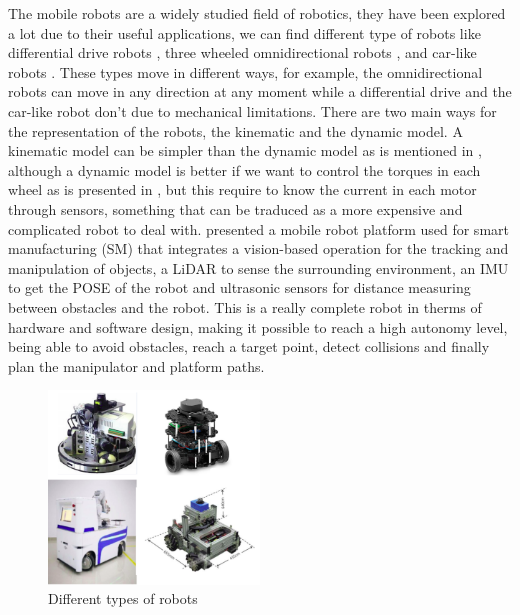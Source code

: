 The mobile robots are a widely studied field of robotics, they have been explored a lot due to their useful applications, we can find different type of robots like differential drive robots \citep{akhtar2011dynamic}, three wheeled omnidirectional robots \citep{hacene2019fuzzy}, and car-like robots \citep{wang2021training}. These types move in different ways, for example, the omnidirectional robots can move in any direction at any moment while a differential drive and the car-like robot don't due to mechanical limitations.
There are two main ways for the representation of the robots, the kinematic and the dynamic model. A kinematic model can be simpler than the dynamic model as is mentioned in \citep{akhtar2011dynamic}, although a dynamic model is better if we want to control the torques in each wheel as is presented in \citep{arcos2019optimal}, but this require to know the current in each motor through sensors, something that can be traduced as a more expensive and complicated robot to deal with.  
\citep{wang2021training} presented a mobile robot platform used for smart manufacturing (SM) that integrates a vision-based operation for the tracking and manipulation of objects, a LiDAR to sense the surrounding environment, an IMU to get the POSE of the robot and ultrasonic sensors for distance measuring between obstacles and the robot. This is a really complete robot in therms of hardware and software design, making it possible to reach a high autonomy level, being able to avoid obstacles, reach a target point, detect collisions and finally plan the manipulator and platform paths.     

\begin{figure}[h!]
    \centering
 	\includegraphics[trim=0 0 0 0,clip,width=0.5\textwidth]{Figs/Robot_types.png}
    \caption{Different types of robots}
    \label{fig:Aruco_bits}
\end{figure}


